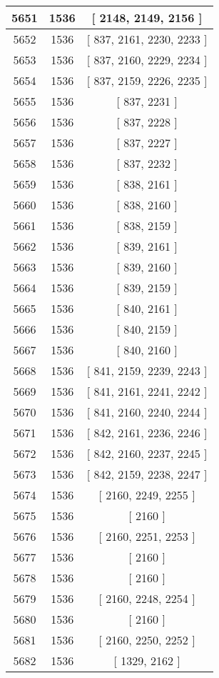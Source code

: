 \begin{center}
\begin{longtable}[H]{|| c c c ||}
5651 & 1536 & [ 2148, 2149, 2156 ] \\ 
\hline
5652 & 1536 & [ 837, 2161, 2230, 2233 ] \\ 
\hline
5653 & 1536 & [ 837, 2160, 2229, 2234 ] \\ 
\hline
5654 & 1536 & [ 837, 2159, 2226, 2235 ] \\ 
\hline
5655 & 1536 & [ 837, 2231 ] \\ 
\hline
5656 & 1536 & [ 837, 2228 ] \\ 
\hline
5657 & 1536 & [ 837, 2227 ] \\ 
\hline
5658 & 1536 & [ 837, 2232 ] \\ 
\hline
5659 & 1536 & [ 838, 2161 ] \\ 
\hline
5660 & 1536 & [ 838, 2160 ] \\ 
\hline
5661 & 1536 & [ 838, 2159 ] \\ 
\hline
5662 & 1536 & [ 839, 2161 ] \\ 
\hline
5663 & 1536 & [ 839, 2160 ] \\ 
\hline
5664 & 1536 & [ 839, 2159 ] \\ 
\hline
5665 & 1536 & [ 840, 2161 ] \\ 
\hline
5666 & 1536 & [ 840, 2159 ] \\ 
\hline
5667 & 1536 & [ 840, 2160 ] \\ 
\hline
5668 & 1536 & [ 841, 2159, 2239, 2243 ] \\ 
\hline
5669 & 1536 & [ 841, 2161, 2241, 2242 ] \\ 
\hline
5670 & 1536 & [ 841, 2160, 2240, 2244 ] \\ 
\hline
5671 & 1536 & [ 842, 2161, 2236, 2246 ] \\ 
\hline
5672 & 1536 & [ 842, 2160, 2237, 2245 ] \\ 
\hline
5673 & 1536 & [ 842, 2159, 2238, 2247 ] \\ 
\hline
5674 & 1536 & [ 2160, 2249, 2255 ] \\ 
\hline
5675 & 1536 & [ 2160 ] \\ 
\hline
5676 & 1536 & [ 2160, 2251, 2253 ] \\ 
\hline
5677 & 1536 & [ 2160 ] \\ 
\hline
5678 & 1536 & [ 2160 ] \\ 
\hline
5679 & 1536 & [ 2160, 2248, 2254 ] \\ 
\hline
5680 & 1536 & [ 2160 ] \\ 
\hline
5681 & 1536 & [ 2160, 2250, 2252 ] \\ 
\hline
5682 & 1536 & [ 1329, 2162 ] \\ 

\end{longtable}
\end{center}
